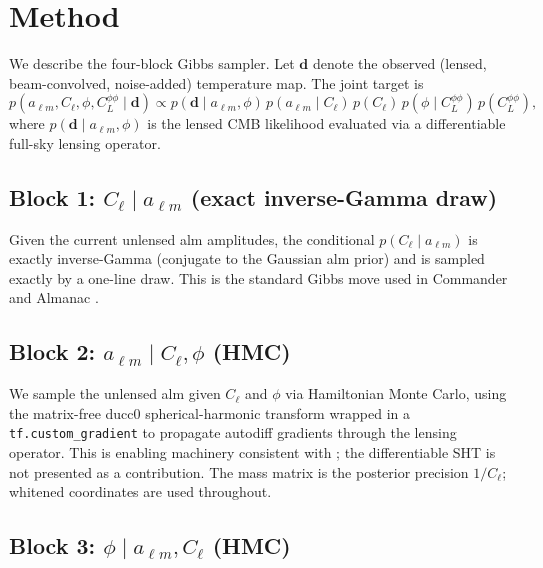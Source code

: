 \documentclass[twocolumn,superscriptaddress,aps,prl,floatfix]{revtex4-2}
\newcommand{\alm}{a_{\ell m}}
\newcommand{\cl}{C_\ell}
\newcommand{\clpp}{C_L^{\phi\phi}}
\begin{document}
\section{Method}
\label{sec:method}

We describe the four-block Gibbs sampler.
Let $\mathbf{d}$ denote the observed (lensed, beam-convolved, noise-added)
temperature map.
The joint target is
\begin{equation}
    p(\alm, \cl, \phi, \clpp \mid \mathbf{d})
    \propto p(\mathbf{d} \mid \alm, \phi)\,
            p(\alm \mid \cl)\,p(\cl)\,p(\phi \mid \clpp)\,p(\clpp),
\end{equation}
where $p(\mathbf{d} \mid \alm, \phi)$ is the lensed CMB likelihood evaluated via
a differentiable full-sky lensing operator.

\subsection{Block 1: $\cl \mid \alm$ (exact inverse-Gamma draw)}
\label{sec:block1}

Given the current unlensed alm amplitudes, the conditional $p(\cl \mid \alm)$
is exactly inverse-Gamma (conjugate to the Gaussian alm prior) and is sampled
exactly by a one-line draw.
This is the standard Gibbs move used in Commander \citep{Commander} and
Almanac \citep{Almanac}.

\subsection{Block 2: $\alm \mid \cl, \phi$ (HMC)}
\label{sec:block2}

We sample the unlensed alm given $\cl$ and $\phi$ via Hamiltonian Monte Carlo,
using the matrix-free ducc0 spherical-harmonic transform \citep{Reinecke:2023}
wrapped in a \texttt{tf.custom\_gradient} to propagate autodiff gradients through
the lensing operator.
This is enabling machinery consistent with \citet{Flinch}; the differentiable
SHT is not presented as a contribution.
The mass matrix is the posterior precision $1/\cl$; whitened coordinates are
used throughout.

\subsection{Block 3: $\phi \mid \alm, \cl$ (HMC)}
\label{sec:block3}
\end{document}
